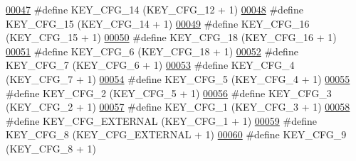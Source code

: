 \begin{DoxyCode}
\hypertarget{dmp_key_8h_source.tex_l00047}{}\hyperlink{dmp_key_8h_a57b6b7e9d0d35132440e8a7c09a93d16}{00047} \textcolor{preprocessor}{#define KEY\_CFG\_14                  (KEY\_CFG\_12 + 1)}
\hypertarget{dmp_key_8h_source.tex_l00048}{}\hyperlink{dmp_key_8h_a0435046e662150820a0cc24da587f7d5}{00048} \textcolor{preprocessor}{#define KEY\_CFG\_15                  (KEY\_CFG\_14 + 1)}
\hypertarget{dmp_key_8h_source.tex_l00049}{}\hyperlink{dmp_key_8h_a19880a4f37b85adf9dfaa7eccbd183ae}{00049} \textcolor{preprocessor}{#define KEY\_CFG\_16                  (KEY\_CFG\_15 + 1)}
\hypertarget{dmp_key_8h_source.tex_l00050}{}\hyperlink{dmp_key_8h_a55f22b6e47ca024decdb65c3dab95a50}{00050} \textcolor{preprocessor}{#define KEY\_CFG\_18                  (KEY\_CFG\_16 + 1)}
\hypertarget{dmp_key_8h_source.tex_l00051}{}\hyperlink{dmp_key_8h_ab8203becdd3b2ab7511ecb5ca5a7a69c}{00051} \textcolor{preprocessor}{#define KEY\_CFG\_6                   (KEY\_CFG\_18 + 1)}
\hypertarget{dmp_key_8h_source.tex_l00052}{}\hyperlink{dmp_key_8h_af8570555f78a4e1d73520be090f23d9a}{00052} \textcolor{preprocessor}{#define KEY\_CFG\_7                   (KEY\_CFG\_6 + 1)}
\hypertarget{dmp_key_8h_source.tex_l00053}{}\hyperlink{dmp_key_8h_a91802491b6da4684594ec8f3a6c21f4f}{00053} \textcolor{preprocessor}{#define KEY\_CFG\_4                   (KEY\_CFG\_7 + 1)}
\hypertarget{dmp_key_8h_source.tex_l00054}{}\hyperlink{dmp_key_8h_ab7bac070f097a941d52987f17958c2be}{00054} \textcolor{preprocessor}{#define KEY\_CFG\_5                   (KEY\_CFG\_4 + 1)}
\hypertarget{dmp_key_8h_source.tex_l00055}{}\hyperlink{dmp_key_8h_ae61b4f19fcf032540a6494e5625da38a}{00055} \textcolor{preprocessor}{#define KEY\_CFG\_2                   (KEY\_CFG\_5 + 1)}
\hypertarget{dmp_key_8h_source.tex_l00056}{}\hyperlink{dmp_key_8h_a981bb2252129c3032a380f819cee0672}{00056} \textcolor{preprocessor}{#define KEY\_CFG\_3                   (KEY\_CFG\_2 + 1)}
\hypertarget{dmp_key_8h_source.tex_l00057}{}\hyperlink{dmp_key_8h_a4288b8fd9061526e1c67b7769258227a}{00057} \textcolor{preprocessor}{#define KEY\_CFG\_1                   (KEY\_CFG\_3 + 1)}
\hypertarget{dmp_key_8h_source.tex_l00058}{}\hyperlink{dmp_key_8h_a63349c3281878c9812df9b8c50ce0e14}{00058} \textcolor{preprocessor}{#define KEY\_CFG\_EXTERNAL            (KEY\_CFG\_1 + 1)}
\hypertarget{dmp_key_8h_source.tex_l00059}{}\hyperlink{dmp_key_8h_a3692f6ad2f88c915a9fc393f6dd46a7c}{00059} \textcolor{preprocessor}{#define KEY\_CFG\_8                   (KEY\_CFG\_EXTERNAL + 1)}
\hypertarget{dmp_key_8h_source.tex_l00060}{}\hyperlink{dmp_key_8h_a1eefc8eff407aef7783647dd936d9bfa}{00060} \textcolor{preprocessor}{#define KEY\_CFG\_9                   (KEY\_CFG\_8 + 1)}

\end{DoxyCode}
